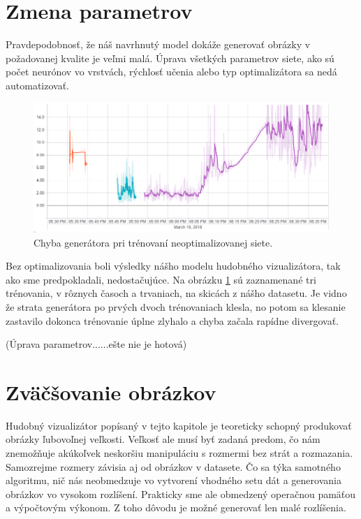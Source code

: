 \section{Zmena parametrov}
Pravdepodobnosť, že náš navrhnutý model dokáže generovať obrázky v požadovanej kvalite je veľmi malá.
Úprava všetkých parametrov siete, ako sú počet neurónov vo vrstvách, rýchlosť učenia alebo typ optimalizátora sa nedá automatizovať. 
\begin{figure}[!ht] 
	\centering 
	\includegraphics[width=.8\textwidth]{figures/g_loss_1} 
	\caption{Chyba generátora pri trénovaní neoptimalizovanej siete.} 
	\label{g_loss_1}
\end{figure}

Bez optimalizovania boli výsledky nášho modelu hudobného vizualizátora, tak ako sme predpokladali, nedostačujúce.
Na obrázku \ref{g_loss_1} sú zaznamenané tri trénovania, v rôznych časoch a trvaniach, na skicách z nášho datasetu.
Je vidno že strata generátora po prvých dvoch trénovaniach klesla, no potom sa klesanie zastavilo dokonca trénovanie úplne zlyhalo a chyba začala rapídne divergovať.

(Úprava parametrov......ešte nie je hotová)

\section{Zväčšovanie obrázkov}
Hudobný vizualizátor popísaný v tejto kapitole je teoreticky schopný produkovať obrázky ľubovoľnej veľkosti.
Veľkosť ale musí byť zadaná predom, čo nám znemožňuje akúkoľvek neskoršiu manipuláciu s rozmermi bez strát a rozmazania.
Samozrejme rozmery závisia aj od obrázkov v datasete.
Čo sa týka samotného algoritmu, nič nás neobmedzuje vo vytvorení vhodného setu dát a generovania obrázkov vo vysokom rozlíšení.
Prakticky sme ale obmedzený operačnou pamäťou a výpočtovým výkonom.
Z toho dôvodu je možné generovať len malé rozlíšenia.

